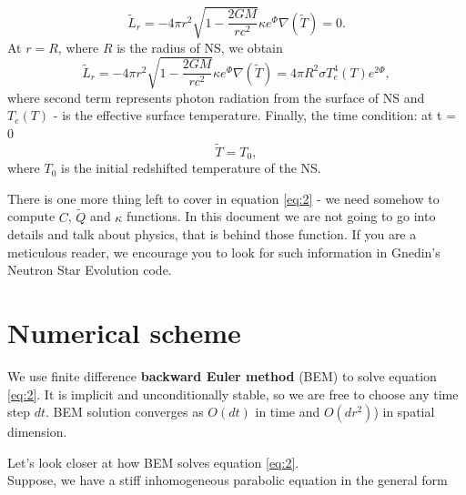 \documentclass[preprint,pre,floats,aps,amsmath,amssymb]{revtex4}
\begin{document}
\begin{equation*} 
\tilde{L}_{r} =  - 4\pi r^{2} \sqrt{1 - \frac{2GM}{rc^{2}}}\kappa e^{\Phi}\nabla(\tilde{T}) = 0.
\end{equation*}
At $r=R$, where $R$ is the radius of NS, we obtain
\begin{equation}
\tilde{L}_{r}  =  - 4\pi r^{2} \sqrt{1 - \frac{2GM}{rc^{2}}}\kappa e^{\Phi}\nabla(\tilde{T}) = 4\pi R^{2} \sigma T^{4}_{e}(T)e^{2\Phi},
\label{eq:3}
 \end{equation}
 where second term represents photon radiation from the surface of NS and $T_{e}(T)$ - is the effective surface temperature. Finally, the time condition: at t = 0 
\begin{equation*}
\tilde{T} = T_0,
\end{equation*}
where $T_0$ is the initial redshifted temperature of the NS.
\par There is one more thing left to cover in equation \ref{eq:2} - we need somehow to compute $C$, $\tilde{Q}$ and $\kappa$ functions. In this document we are not going to go into details and talk about physics, that is behind those function. If you are a meticulous reader, we encourage you to look for such information in Gnedin's Neutron Star Evolution code.
\section{Numerical scheme} \label{Numerical scheme}
\par  We use finite difference  \textbf{backward Euler method} (BEM) to solve equation \ref{eq:2}. It is implicit and unconditionally stable, so we are free to choose any time step $dt$. BEM solution converges as $O(dt)$ in time and $O(dr^{2})$) in spatial dimension.
\newpage
\par Let's look closer at how BEM solves equation \ref{eq:2}.
\\ 
Suppose, we have a stiff inhomogeneous parabolic equation in the general form
\end{document}
